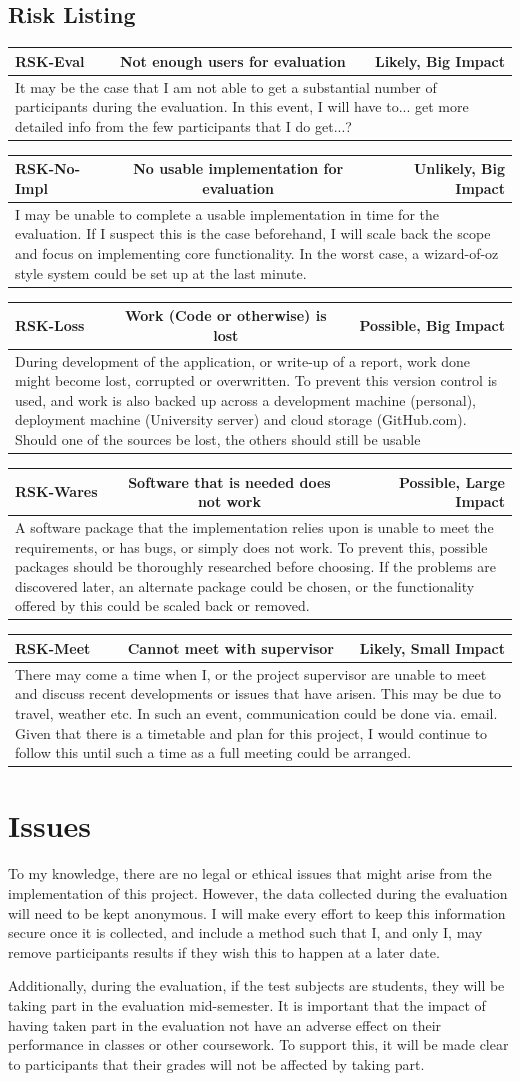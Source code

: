 \documentclass[a4paper,11pt]{report}
\newcommand{\riskitem}[4]{\begin{tabularx}{\textwidth}{|l|cr|} \hline \textbf{RSK-#1} & #2 & #3 \\ \hline \multicolumn{3}{|X|}{#4} \\ \hline \end{tabularx}}
\begin{document}
\subsection*{Risk Listing}
\riskitem{Eval}{Not enough users for evaluation}{Likely, Big Impact}{It may be the case that I am not able to get a substantial number of participants during the evaluation. In this event, I will have to... get more detailed info from the few participants that I do get...?}
\riskitem{No-Impl}{No usable implementation for evaluation}{Unlikely, Big Impact}{I may be unable to complete a usable implementation in time for the evaluation. If I suspect this is the case beforehand, I will scale back the scope and focus on implementing core functionality. In the worst case, a wizard-of-oz style system could be set up at the last minute.}
\riskitem{Loss}{Work (Code or otherwise) is lost}{Possible, Big Impact}{During development of the application, or write-up of a report, work done might become lost, corrupted or overwritten. To prevent this version control is used, and work is also backed up across a development machine (personal), deployment machine (University server) and cloud storage (GitHub.com). Should one of the sources be lost, the others should still be usable}
\riskitem{Wares}{Software that is needed does not work}{Possible, Large Impact}{A software package that the implementation relies upon is unable to meet the requirements, or has bugs, or simply does not work. To prevent this, possible packages should be thoroughly researched before choosing. If the problems are discovered later, an alternate package could be chosen, or the functionality offered by this could be scaled back or removed.}
\riskitem{Meet}{Cannot meet with supervisor}{Likely, Small Impact}{There may come a time when I, or the project supervisor are unable to meet and discuss recent developments or issues that have arisen. This may be due to travel, weather etc. In such an event, communication could be done via. email. Given that there is a timetable and plan for this project, I would continue to follow this until such a time as a full meeting could be arranged.}
\section{Issues}
To my knowledge, there are no legal or ethical issues that might arise from the implementation of this project. However, the data collected during the evaluation will need to be kept anonymous. I will make every effort to keep this information secure once it is collected, and include a method such that I, and only I, may remove participants results if they wish this to happen at a later date.\par
Additionally, during the evaluation, if the test subjects are students, they will be taking part in the evaluation mid-semester. It is important that the impact of having taken part in the evaluation not have an adverse effect on their performance in classes or other coursework. To support this, it will be made clear to participants that their grades will not be affected by taking part.
\end{document}
